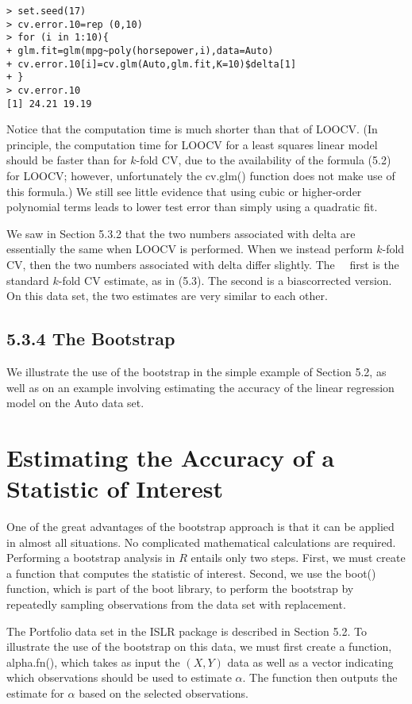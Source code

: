\documentclass[10pt]{article}
\begin{document}
\begin{verbatim}
> set.seed(17)
> cv.error.10=rep (0,10)
> for (i in 1:10){
+ glm.fit=glm(mpg~poly(horsepower,i),data=Auto)
+ cv.error.10[i]=cv.glm(Auto,glm.fit,K=10)$delta[1]
+ }
> cv.error.10
[1] 24.21 19.19
\end{verbatim}

Notice that the computation time is much shorter than that of LOOCV. (In principle, the computation time for LOOCV for a least squares linear model should be faster than for $k$-fold CV, due to the availability of the formula (5.2) for LOOCV; however, unfortunately the cv.glm() function does not make use of this formula.) We still see little evidence that using cubic or higher-order polynomial terms leads to lower test error than simply using a quadratic fit.

We saw in Section 5.3.2 that the two numbers associated with delta are essentially the same when LOOCV is performed. When we instead perform $k$-fold CV, then the two numbers associated with delta differ slightly. The\
\
first is the standard $k$-fold CV estimate, as in (5.3). The second is a biascorrected version. On this data set, the two estimates are very similar to each other.

\subsection*{5.3.4 The Bootstrap}
We illustrate the use of the bootstrap in the simple example of Section 5.2, as well as on an example involving estimating the accuracy of the linear regression model on the Auto data set.

\section*{Estimating the Accuracy of a Statistic of Interest}
One of the great advantages of the bootstrap approach is that it can be applied in almost all situations. No complicated mathematical calculations are required. Performing a bootstrap analysis in $R$ entails only two steps. First, we must create a function that computes the statistic of interest. Second, we use the boot() function, which is part of the boot library, to perform the bootstrap by repeatedly sampling observations from the data set with replacement.

The Portfolio data set in the ISLR package is described in Section 5.2. To illustrate the use of the bootstrap on this data, we must first create a function, alpha.fn(), which takes as input the $(X, Y)$ data as well as a vector indicating which observations should be used to estimate $\alpha$. The function then outputs the estimate for $\alpha$ based on the selected observations.
\end{document}
